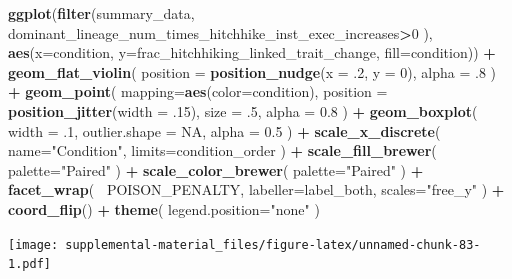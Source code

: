 \documentclass[]{book}
\newenvironment{Shaded}{\begin{snugshade}}{\end{snugshade}}
\newcommand{\DataTypeTok}[1]{\textcolor[rgb]{0.13,0.29,0.53}{#1}}
\newcommand{\DecValTok}[1]{\textcolor[rgb]{0.00,0.00,0.81}{#1}}
\newcommand{\FloatTok}[1]{\textcolor[rgb]{0.00,0.00,0.81}{#1}}
\newcommand{\KeywordTok}[1]{\textcolor[rgb]{0.13,0.29,0.53}{\textbf{#1}}}
\newcommand{\NormalTok}[1]{#1}
\newcommand{\OperatorTok}[1]{\textcolor[rgb]{0.81,0.36,0.00}{\textbf{#1}}}
\newcommand{\OtherTok}[1]{\textcolor[rgb]{0.56,0.35,0.01}{#1}}
\newcommand{\StringTok}[1]{\textcolor[rgb]{0.31,0.60,0.02}{#1}}
\begin{document}
\begin{Shaded}
\begin{Highlighting}[]
\KeywordTok{ggplot}\NormalTok{(}\KeywordTok{filter}\NormalTok{(summary_data, dominant_lineage_num_times_hitchhike_inst_exec_increases}\OperatorTok{>}\DecValTok{0}\NormalTok{ ), }\KeywordTok{aes}\NormalTok{(}\DataTypeTok{x=}\NormalTok{condition, }\DataTypeTok{y=}\NormalTok{frac_hitchhiking_linked_trait_change, }\DataTypeTok{fill=}\NormalTok{condition)) }\OperatorTok{+}
\StringTok{  }\KeywordTok{geom_flat_violin}\NormalTok{(}
    \DataTypeTok{position =} \KeywordTok{position_nudge}\NormalTok{(}\DataTypeTok{x =} \FloatTok{.2}\NormalTok{, }\DataTypeTok{y =} \DecValTok{0}\NormalTok{),}
    \DataTypeTok{alpha =} \FloatTok{.8}
\NormalTok{  ) }\OperatorTok{+}
\StringTok{  }\KeywordTok{geom_point}\NormalTok{(}
    \DataTypeTok{mapping=}\KeywordTok{aes}\NormalTok{(}\DataTypeTok{color=}\NormalTok{condition),}
    \DataTypeTok{position =} \KeywordTok{position_jitter}\NormalTok{(}\DataTypeTok{width =} \FloatTok{.15}\NormalTok{),}
    \DataTypeTok{size =} \FloatTok{.5}\NormalTok{,}
    \DataTypeTok{alpha =} \FloatTok{0.8}
\NormalTok{  ) }\OperatorTok{+}
\StringTok{  }\KeywordTok{geom_boxplot}\NormalTok{(}
    \DataTypeTok{width =} \FloatTok{.1}\NormalTok{,}
    \DataTypeTok{outlier.shape =} \OtherTok{NA}\NormalTok{,}
    \DataTypeTok{alpha =} \FloatTok{0.5}
\NormalTok{  ) }\OperatorTok{+}
\StringTok{  }\KeywordTok{scale_x_discrete}\NormalTok{(}
    \DataTypeTok{name=}\StringTok{"Condition"}\NormalTok{,}
    \DataTypeTok{limits=}\NormalTok{condition_order}
\NormalTok{  ) }\OperatorTok{+}
\StringTok{  }\KeywordTok{scale_fill_brewer}\NormalTok{(}
    \DataTypeTok{palette=}\StringTok{"Paired"}
\NormalTok{  ) }\OperatorTok{+}
\StringTok{  }\KeywordTok{scale_color_brewer}\NormalTok{(}
    \DataTypeTok{palette=}\StringTok{"Paired"}
\NormalTok{  ) }\OperatorTok{+}
\StringTok{  }\KeywordTok{facet_wrap}\NormalTok{(}
    \OperatorTok{~}\NormalTok{POISON_PENALTY,}
    \DataTypeTok{labeller=}\NormalTok{label_both,}
    \DataTypeTok{scales=}\StringTok{"free_y"}
\NormalTok{  ) }\OperatorTok{+}
\StringTok{  }\KeywordTok{coord_flip}\NormalTok{() }\OperatorTok{+}
\StringTok{  }\KeywordTok{theme}\NormalTok{(}
    \DataTypeTok{legend.position=}\StringTok{"none"}
\NormalTok{  )}
\end{Highlighting}
\end{Shaded}

\texttt{[image: supplemental-material\_files/figure-latex/unnamed-chunk-83-1.pdf]}
\end{document}
